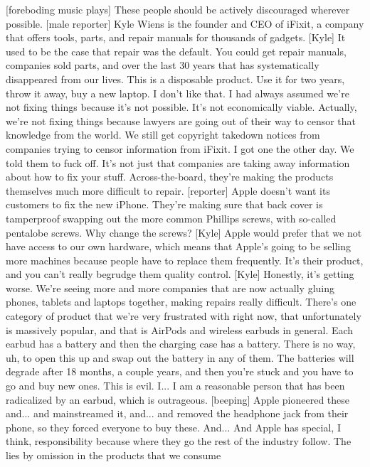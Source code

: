 \documentclass[a4paper]{article}
\begin{document}
	[foreboding music plays]
	These people should be actively discouraged wherever possible.
	[male reporter] Kyle Wiens is the founder and CEO of iFixit,
	a company that offers tools, parts, and repair manuals
	for thousands of gadgets.
	[Kyle] It used to be the case that repair was the default.
	You could get repair manuals, companies sold parts,
	and over the last 30 years that has systematically disappeared from our lives.
	This is a disposable product.
	Use it for two years, throw it away, buy a new laptop.
	I don't like that.
	I had always assumed we're not fixing things because it's not possible.
	It's not economically viable.
	Actually, we're not fixing things because lawyers are going out of their way
	to censor that knowledge from the world.
	We still get copyright takedown notices
	from companies trying to censor information from iFixit.
	I got one the other day.
	We told them to fuck off.
	It's not just that companies are taking away information
	about how to fix your stuff.
	Across-the-board, they're making the products themselves
	much more difficult to repair.
	[reporter] Apple doesn't want its customers to fix the new iPhone.
	They're making sure that back cover is tamperproof
	swapping out the more common Phillips screws,
	with so-called pentalobe screws.
	Why change the screws?
	[Kyle] Apple would prefer that we not have access to our own hardware,
	which means that Apple's going to be selling more machines
	because people have to replace them frequently.
	It's their product, and you can't really begrudge them quality control.
	[Kyle] Honestly, it's getting worse.
	We're seeing more and more companies
	that are now actually gluing phones, tablets and laptops together,
	making repairs really difficult.
	There's one category of product that we're very frustrated with right now,
	that unfortunately is massively popular,
	and that is AirPods and wireless earbuds in general.
	Each earbud has a battery and then the charging case has a battery.
	There is no way, uh, to open this up and swap out the battery in any of them.
	The batteries will degrade after 18 months, a couple years,
	and then you're stuck and you have to go and buy new ones.
	This is evil.
	I... I am a reasonable person that has been radicalized by an earbud,
	which is outrageous.
	[beeping]
	Apple pioneered these and... and mainstreamed it,
	and... and removed the headphone jack from their phone,
	so they forced everyone to buy these.
	And... And Apple has special, I think, responsibility
	because where they go the rest of the industry follow.
	The lies by omission in the products that we consume
\end{document}
